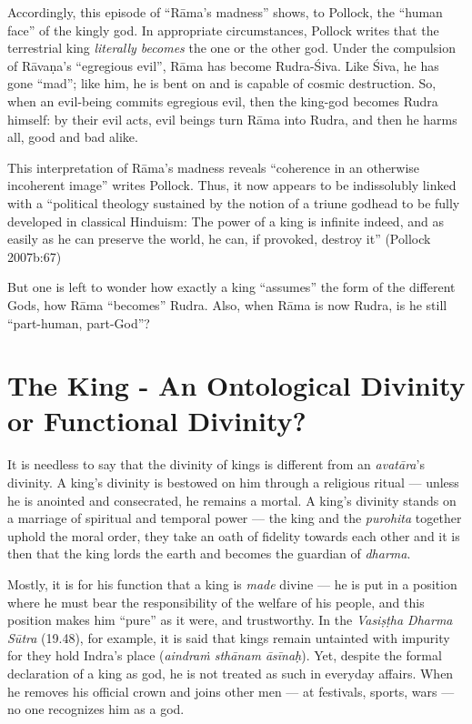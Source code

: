 Accordingly, this episode of “Rāma’s madness” shows, to Pollock, the “human face” of the kingly god.  In appropriate circumstances, Pollock writes that the terrestrial king {\sl literally becomes} the one or the other god. Under the compulsion of Rāvaṇa’s “egregious evil”, Rāma has become Rudra-Śiva. Like Śiva, he has gone “mad”; like him, he is bent on and is capable of cosmic destruction. So, when an evil-being commits egregious evil, then the king-god becomes Rudra himself: by their evil acts, evil beings turn Rāma into Rudra, and then he harms all, good and bad alike. 

This interpretation of Rāma’s madness reveals “coherence in an otherwise incoherent image” writes Pollock. Thus, it now appears to be indissolubly linked with a “political theology sustained by the notion of a triune godhead to be fully developed in classical Hinduism: The power of a king is infinite indeed, and as easily as he can preserve the world, he can, if provoked, destroy it” (Pollock 2007b:67) 

But one is left to wonder how exactly a king “assumes” the form of the different Gods, how Rāma “becomes” Rudra. Also, when Rāma is now Rudra, is he still “part-human, part-God”? \\[-25pt]

\section{The King - An Ontological Divinity or Functional Divinity?}\label{sec2.5}

It is needless to say that the divinity of kings is different from an {\sl avatāra}’s divinity. A king’s divinity is bestowed on him through a religious ritual --- unless he is anointed and consecrated, he remains a mortal. A king’s divinity stands on a marriage of spiritual and temporal power --- the king and the {\sl purohita} together uphold the moral order, they take an oath of fidelity towards each other and it is then that the king lords the earth and becomes the guardian of {\sl dharma}.

Mostly, it is for his function that a king is {\sl made} divine --- he is put in a position where he must bear the responsibility of the welfare of his people, and this position makes him “pure” as it were, and trustworthy. In the {\sl Vasiṣṭha Dharma Sūtra} (19.48), for example, it is said that kings remain untainted with impurity for they hold Indra’s place ({\sl aindraṁ sthānam āsīnaḥ}). Yet, despite the formal declaration of a king as god, he is not treated as such in everyday affairs. When he removes his official crown and joins other men --- at festivals, sports, wars --- no one recognizes him as a god.  

